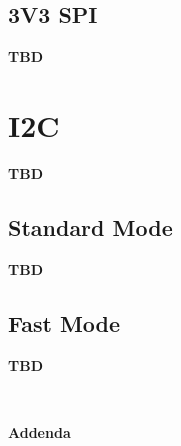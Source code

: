 \documentclass[11pt, a4paper, listof=numbered, captions=tableheading, headinclude, table, xcdraw]{scrreprt}
\begin{document}
\subsection{3V3 SPI}
\textbf{\textcolor[HTML]{FF0000}{TBD}}

\section{I2C}
\textbf{\textcolor[HTML]{FF0000}{TBD}}
\subsection{Standard Mode}
\textbf{\textcolor[HTML]{FF0000}{TBD}}
\subsection{Fast Mode}
\textbf{\textcolor[HTML]{FF0000}{TBD}}


\newpage
\appendix
\pagestyle{empty}
\vspace*{\fill}
\begin{center}
\hrulefill\\
\vspace{4mm}
	\begin{HUGE}
		\textbf{Addenda}
	\end{HUGE}\\
\hrulefill\\
\end{center}
\vspace*{\fill}

\pagestyle{plain}
\end{document}

